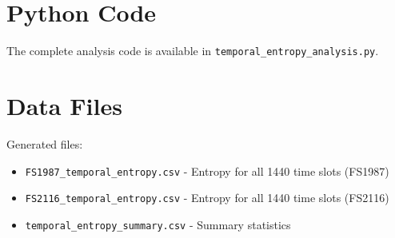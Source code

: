 \documentclass[12pt]{article}
\begin{document}
\appendix

\section{Python Code}

The complete analysis code is available in \texttt{temporal\_entropy\_analysis.py}.

\section{Data Files}

Generated files:
\begin{itemize}
    \item \texttt{FS1987\_temporal\_entropy.csv} - Entropy for all 1440 time slots (FS1987)
    \item \texttt{FS2116\_temporal\_entropy.csv} - Entropy for all 1440 time slots (FS2116)
    \item \texttt{temporal\_entropy\_summary.csv} - Summary statistics
\end{itemize}
\end{document}
